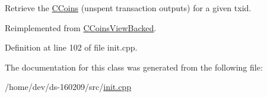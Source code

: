 Retrieve the \hyperlink{class_c_coins}{C\+Coins} (unspent transaction outputs) for a given txid. 



Reimplemented from \hyperlink{class_c_coins_view_backed_a21b95a9910f94e9b7ebed62a6f329ea0}{C\+Coins\+View\+Backed}.



Definition at line 102 of file init.\+cpp.



The documentation for this class was generated from the following file\+:\begin{DoxyCompactItemize}
\item 
/home/dev/ds-\/160209/src/\hyperlink{init_8cpp}{init.\+cpp}\end{DoxyCompactItemize}
